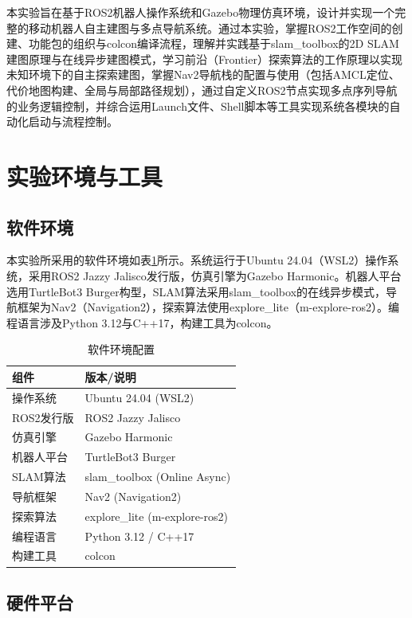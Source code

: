 \documentclass[a4paper,12pt]{article}
\begin{document}
本实验旨在基于ROS2机器人操作系统和Gazebo物理仿真环境，设计并实现一个完整的移动机器人自主建图与多点导航系统。通过本实验，掌握ROS2工作空间的创建、功能包的组织与colcon编译流程，理解并实践基于slam\_toolbox的2D SLAM建图原理与在线异步建图模式，学习前沿（Frontier）探索算法的工作原理以实现未知环境下的自主探索建图，掌握Nav2导航栈的配置与使用（包括AMCL定位、代价地图构建、全局与局部路径规划），通过自定义ROS2节点实现多点序列导航的业务逻辑控制，并综合运用Launch文件、Shell脚本等工具实现系统各模块的自动化启动与流程控制。

\section{实验环境与工具}

\subsection{软件环境}

本实验所采用的软件环境如表\ref{tab:software}所示。系统运行于Ubuntu 24.04（WSL2）操作系统，采用ROS2 Jazzy Jalisco发行版，仿真引擎为Gazebo Harmonic。机器人平台选用TurtleBot3 Burger构型，SLAM算法采用slam\_toolbox的在线异步模式，导航框架为Nav2（Navigation2），探索算法使用explore\_lite（m-explore-ros2）。编程语言涉及Python 3.12与C++17，构建工具为colcon。

\begin{table}[H]
\centering
\caption{软件环境配置}
\label{tab:software}
\begin{tabular}{ll}
\toprule
组件 & 版本/说明 \\
\midrule
操作系统 & Ubuntu 24.04 (WSL2) \\
ROS2发行版 & ROS2 Jazzy Jalisco \\
仿真引擎 & Gazebo Harmonic \\
机器人平台 & TurtleBot3 Burger \\
SLAM算法 & slam\_toolbox (Online Async) \\
导航框架 & Nav2 (Navigation2) \\
探索算法 & explore\_lite (m-explore-ros2) \\
编程语言 & Python 3.12 / C++17 \\
构建工具 & colcon \\
\bottomrule
\end{tabular}
\end{table}

\subsection{硬件平台}
\end{document}
